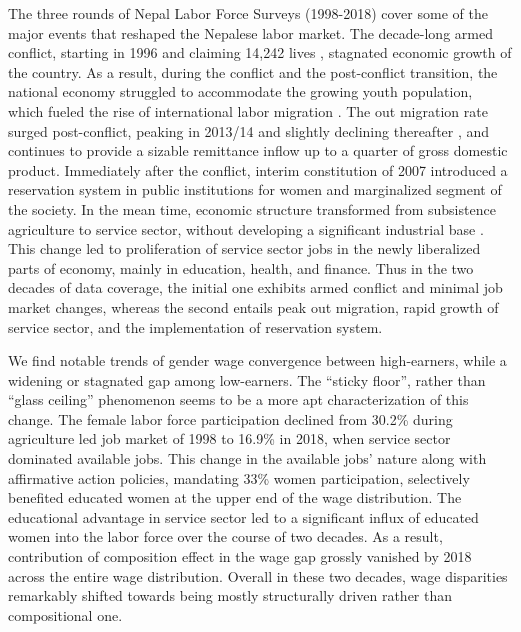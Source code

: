 The three rounds of Nepal Labor Force Surveys (1998-2018) cover some of the major events that reshaped the Nepalese labor market. The decade-long armed conflict, starting in 1996 and claiming 14,242 lives \parencite{Joshi2015}, stagnated economic growth of the country. As a result, during the conflict and the post-conflict transition, the national economy struggled to accommodate the growing youth population, which fueled the rise of international labor migration \parencite{libois2016households}. The out migration rate surged post-conflict, peaking in 2013/14 and slightly declining thereafter \parencite{MoLE/GoN2013, MFES/GoN2020}, and continues to provide a sizable remittance inflow up to a quarter of gross domestic product. Immediately after the conflict, interim constitution of 2007 introduced a reservation system in public institutions for women and marginalized segment of the society\parencite{Subedi2022, Mainali2017}. In the mean time, economic structure transformed from subsistence agriculture to service sector, without developing a significant industrial base \parencite{Sapkota2013}. This change led to proliferation of service sector jobs in the newly liberalized parts of economy, mainly in education, health, and finance. Thus in the two decades of data coverage, the initial one exhibits armed conflict and minimal job market changes, whereas the second entails peak out migration, rapid growth of service sector, and the implementation of reservation system.\par

We find notable trends of gender wage convergence between high-earners, while a widening or stagnated gap among low-earners. The ``sticky floor'', rather than ``glass ceiling'' phenomenon seems to be a more apt characterization of this change. The female labor force participation declined from 30.2\% during agriculture led job market of 1998 to 16.9\% in 2018, when service sector dominated available jobs. This change in the available jobs' nature along with affirmative action policies, mandating 33\% women participation, selectively benefited educated women at the upper end of the wage distribution. The educational advantage in service sector led to a significant influx of educated women into the labor force over the course of two decades. As a result,  contribution of composition effect in the wage gap grossly vanished by 2018 across the entire wage distribution. Overall in these two decades, wage disparities remarkably shifted towards being mostly structurally driven rather than compositional one.\par 

